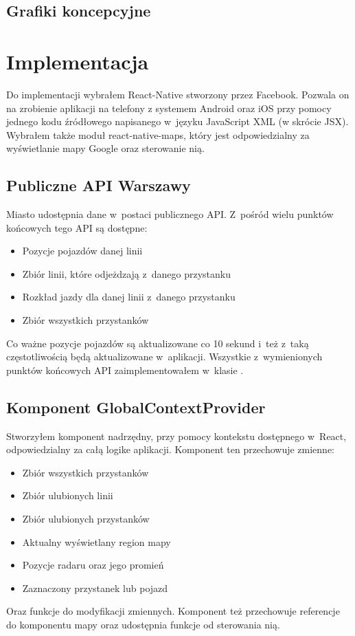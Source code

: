 \documentclass{SGGW-thesis}
\begin{document}
\section{Grafiki koncepcyjne}

\chapter{Implementacja}
Do implementacji wybrałem React-Native stworzony przez Facebook. Pozwala on na zrobienie aplikacji na telefony
z systemem Android oraz iOS przy pomocy jednego kodu źródłowego napisanego w~języku JavaScript XML
(w skrócie JSX). Wybrałem także moduł react-native-maps, który jest odpowiedzialny za wyświetlanie
mapy Google oraz sterowanie nią.

\section{Publiczne API Warszawy}
Miasto udostępnia dane w~postaci publicznego API. Z~pośród wielu punktów końcowych tego API są dostępne:
\begin{itemize}
  \item{Pozycje pojazdów danej linii}
  \item{Zbiór linii, które odjeżdzają z~danego przystanku}
  \item{Rozkład jazdy dla danej linii z~danego przystanku}
  \item{Zbiór wszystkich przystanków}
\end{itemize}
Co ważne pozycje pojazdów są aktualizowane co 10 sekund i~też z~taką częstotliwością będą
aktualizowane w~aplikacji.
Wszystkie z~wymienionych punktów końcowych API zaimplementowałem w~klasie .


\section{Komponent GlobalContextProvider}
Stworzyłem komponent nadrzędny, przy pomocy kontekstu dostępnego w~React, odpowiedzialny za całą logike
aplikacji.
Komponent ten przechowuje zmienne:
\begin{itemize}
  \item{Zbiór wszystkich przystanków}
  \item{Zbiór ulubionych linii}
  \item{Zbiór ulubionych przystanków}
  \item{Aktualny wyświetlany region mapy}
  \item{Pozycje radaru oraz jego promień}
  \item{Zaznaczony przystanek lub pojazd}
\end{itemize}
Oraz funkcje do modyfikacji zmiennych.
Komponent też przechowuje referencje do komponentu mapy oraz udostępnia funkcje
od sterowania nią.
\end{document}
